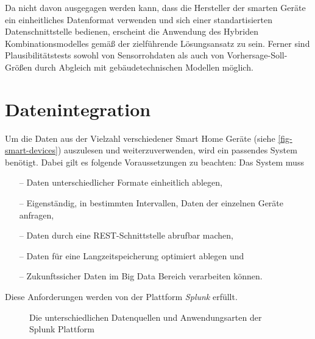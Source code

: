 Da nicht davon ausgegagen werden kann, dass die Hersteller der smarten Geräte ein einheitliches Datenformat verwenden und sich einer standartisierten Datenschnittstelle bedienen, erscheint die Anwendung des Hybriden Kombinationsmodelles gemäß  der zielführende Lösungsansatz zu sein. Ferner sind Plausibilitätstests sowohl von Sensorrohdaten als auch von Vorhersage-Soll-Größen durch Abgleich mit gebäudetechnischen Modellen möglich.

\section{Datenintegration}
Um die Daten aus der Vielzahl verschiedener Smart Home Geräte (siehe \cref{fig-smart-devices}) auszulesen und weiterzuverwenden, wird ein passendes System benötigt. Dabei gilt es folgende Voraussetzungen zu beachten: Das System muss

\begin{itemize}
    \itemsep0em
    \item[--] Daten unterschiedlicher Formate einheitlich ablegen,
    \item[--] Eigenständig, in bestimmten Intervallen, Daten der einzelnen Geräte anfragen,
    \item[--] Daten durch eine REST-Schnittstelle abrufbar machen,
    \item[--] Daten für eine Langzeitspeicherung optimiert ablegen und
    \item[--] Zukunftssicher Daten im Big Data Bereich verarbeiten können.
\end{itemize}

Diese Anforderungen werden von der Plattform \textit{Splunk} erfüllt.

\begin{figure}[htbp]
    \centering
    \caption{\label{fig-splunk} Die unterschiedlichen Datenquellen und Anwendungsarten der Splunk Plattform}
\end{figure}


